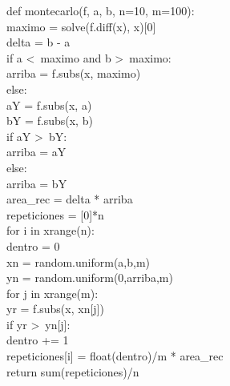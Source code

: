 \documentclass[10pt,letterpaper]{article}
\newenvironment{Code}
{
\begin{lrbox}{\selvestebox}%
\begin{minipage}{\dimexpr\columnwidth-2\fboxsep\relax}
\fontfamily{\ttdefault}\selectfont
}
{\end{minipage}\end{lrbox}%
\begin{center}
\colorbox{light-gray}{\usebox{\selvestebox}}
\end{center}
}
\begin{document}
\begin{footnotesize}
\begin{Code}
def montecarlo(f, a, b, n=10, m=100):\\
\hspace*{5mm} maximo = solve(f.diff(x), x)[0]\\
\hspace*{5mm} delta = b - a\\
\hspace*{5mm} if a <\ maximo and b >\ maximo:\\
\hspace*{11mm} arriba = f.subs(x, maximo)\\
\hspace*{5mm} else:\\
\hspace*{11mm} aY = f.subs(x, a)\\
\hspace*{11mm} bY = f.subs(x, b)\\
\hspace*{11mm} if aY >\ bY:\\
\hspace*{17mm} arriba = aY\\
\hspace*{11mm} else:\\
\hspace*{17mm} arriba = bY\\
\hspace*{5mm} area\_rec = delta * arriba\\
\hspace*{5mm} repeticiones = [0]*n\\
\hspace*{5mm} for i in xrange(n):\\
\hspace*{11mm} dentro = 0\\
\hspace*{11mm} xn = random.uniform(a,b,m)\\
\hspace*{11mm} yn = random.uniform(0,arriba,m)\\
\hspace*{11mm} for j in xrange(m):\\
\hspace*{17mm} yr = f.subs(x, xn[j])\\
\hspace*{17mm} if yr >\ yn[j]:\\
\hspace*{23mm} dentro += 1\\
\hspace*{11mm} repeticiones[i] = float(dentro)/m * area\_rec\\
\hspace*{5mm} return sum(repeticiones)/n
\end{Code}
\end{footnotesize}
\end{document}
